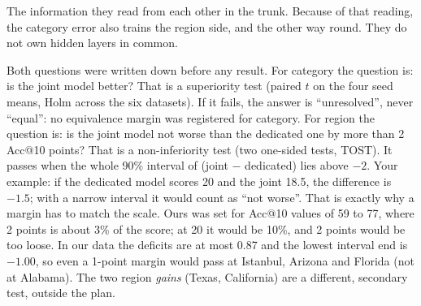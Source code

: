 The information they read from each other in the trunk. Because of that reading, the category error
also trains the region side, and the other way round. They do not own hidden layers in common.

Both questions were written down before any result. For category the question is: is the joint model
better? That is a superiority test (paired $t$ on the four seed means, Holm across the six datasets). If
it fails, the answer is ``unresolved'', never ``equal'': no equivalence margin was registered for
category. For region the question is: is the joint model not worse than the dedicated one by more than
2 Acc@10 points? That is a non-inferiority test (two one-sided tests, TOST). It passes when the whole
90\% interval of (joint $-$ dedicated) lies above $-2$.
Your example: if the dedicated model scores 20 and the joint 18.5, the difference is $-1.5$; with a
narrow interval it would count as ``not worse''. That is exactly why a margin has to match the scale.
Ours was set for Acc@10 values of 59 to 77, where 2 points is about 3\% of the score; at 20 it would be
10\%, and 2 points would be too loose. In our data the deficits are at most 0.87 and the lowest
interval end is $-1.00$, so even a 1-point margin would pass at Istanbul, Arizona and Florida (not at
Alabama). The two region \emph{gains} (Texas, California) are a different, secondary test, outside the
plan.

